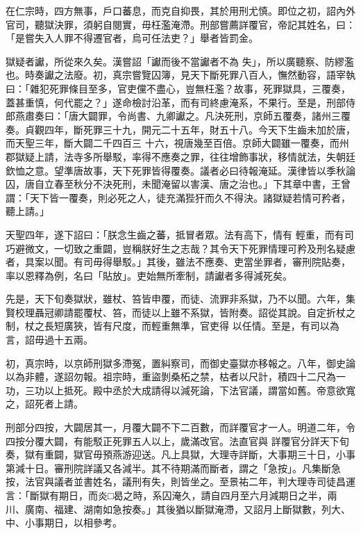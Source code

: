 \begin{pinyinscope}
 在仁宗時，四方無事，戶口蕃息，而克自抑畏，其於用刑尤慎。即位之初，詔內外官司，聽獄決罪，須躬自閱實，毋枉濫淹滯。刑部嘗薦詳覆官，帝記其姓名，曰：「是嘗失入人罪不得遷官者，烏可任法吏？」舉者皆罰金。



 獄疑者讞，所從來久矣。漢嘗詔「讞而後不當讞者不為
 失」，所以廣聽察、防繆濫也。時奏讞之法廢。初，真宗嘗覽囚簿，見天下斷死罪八百人，憮然動容，語宰執曰：「雜犯死罪條目至多，官吏儻不盡心，豈無枉濫？故事，死罪獄具，三覆奏，蓋甚重慎，何代罷之？」遂命檢討沿革，而有司終慮淹系，不果行。至是，刑部侍郎燕肅奏曰：「唐大闢罪，令尚書、九卿讞之。凡決死刑，京師五覆奏，諸州三覆奏。貞觀四年，斷死罪三十九，開元二十五年，財五十八。今天下生齒未加於唐，而天聖三年，斷大闢二千四百三
 十六，視唐幾至百倍。京師大闢雖一覆奏，而州郡獄疑上請，法寺多所舉駁，率得不應奏之罪，往往增飾事狀，移情就法，失朝廷欽恤之意。望準唐故事，天下死罪皆得覆奏。議者必曰待報淹延。漢律皆以季秋論囚，唐自立春至秋分不決死刑，未聞淹留以害漢、唐之治也。」下其章中書，王曾謂：「天下皆一覆奏，則必死之人，徒充滿狴犴而久不得決。諸獄疑若情可矜者，聽上請。」



 天聖四年，遂下詔曰：「朕念生齒之蕃，抵冒者眾。法有高下，情有
 輕重，而有司巧避微文，一切致之重闢，豈稱朕好生之志哉？其令天下死罪情理可矜及刑名疑慮者，具案以聞。有司毋得舉駁。」其後，雖法不應奏、吏當坐罪者，審刑院貼奏，率以恩釋為例，名曰「貼放」。吏始無所牽制，請讞者多得減死矣。



 先是，天下旬奏獄狀，雖杖、笞皆申覆，而徒、流罪非系獄，乃不以聞。六年，集賢校理聶冠卿請罷覆杖、笞，而徒以上雖不系獄，皆附奏。詔從其說。自定折杖之制，杖之長短廣狹，皆有尺度，而輕重無準，官吏得
 以任情。至是，有司以為言，詔毋過十五兩。



 初，真宗時，以京師刑獄多滯冤，置糾察司，而御史臺獄亦移報之。八年，御史論以為非體，遂詔勿報。祖宗時，重盜剝桑柘之禁，枯者以尺計，積四十二尺為一功，三功以上抵死。殿中丞於大成請得以減死論，下法官議，謂當如舊。帝意欲寬之，詔死者上請。



 刑部分四按，大闢居其一，月覆大闢不下二百數，而詳覆官才一人。明道二年，令四按分覆大闢，有能駁正死罪五人以上，歲滿改官。法直官與
 詳覆官分詳天下旬奏，獄有重闢，獄官毋預燕游迎送。凡上具獄，大理寺詳斷，大事期三十日，小事第減十日。審刑院詳議又各減半。其不待期滿而斷者，謂之「急按」。凡集斷急按，法官與議者並書姓名，議刑有失，則皆坐之。至景祐二年，判大理寺司徒昌運言：「斷獄有期日，而炎□曷之時，系囚淹久，請自四月至六月減期日之半，兩川、廣南、福建、湖南如急按奏。」其後猶以斷獄淹滯，又詔月上斷獄數，列大、中、小事期日，以相參考。




\end{pinyinscope}
